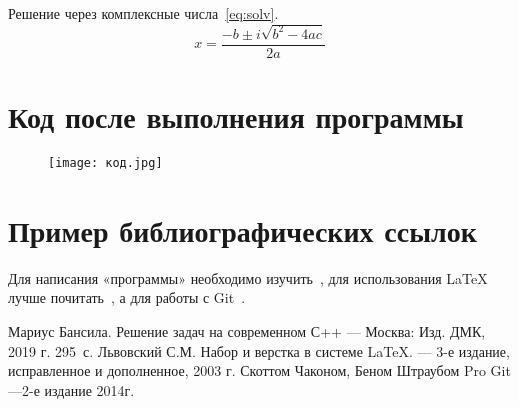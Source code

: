 \documentclass[12pt,a4paper]{scrartcl}
\begin{document}
Решение через комплексные числа~\eqref{eq:solv}.
\begin{equation}\label{eq:solv}
 x=\frac{-b\pm{i}\sqrt{b^2-4ac}}{2a}
\end{equation}

\section{Код после выполнения программы}
\label{sec:picexample}
\begin{figure}[h]
	
	\texttt{[image: код.jpg]}
\end{figure}

\section{Пример библиографических ссылок}

Для написания «программы» необходимо 
изучить~\cite{Marius}, для использования \LaTeX{} лучше
почитать~\cite{Lvovsky-2003}, а для работы с Git~\cite{Git}.

\begin{thebibliography}{9}
Мариус Бансила. Решение задач на современном С++ \newblock --- Москва: Изд. ДМК, 2019 г. 295~с.
Львовский С.М. Набор и верстка в системе \LaTeX{}. \newblock --- 3-е издание, исправленное и дополненное, 2003 г.
 Скоттом Чаконом, Беном Штраубом Pro Git \newblock ---2-е издание 2014г.
\end{thebibliography}
\end{document}
